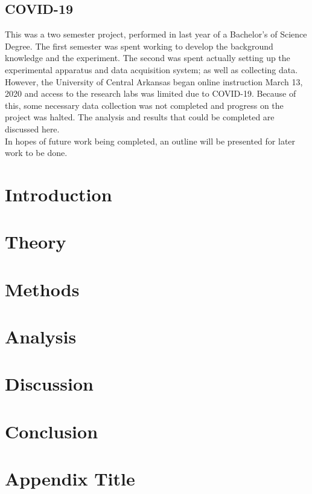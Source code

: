 \documentclass[letterpaper, 12pt]{report}
\begin{document}


\clearpage
\section*{COVID-19}
This was a two semester project, performed in last year of a Bachelor's of Science Degree. The first semester was spent working to develop the background knowledge and the experiment. The second was spent actually setting up the experimental apparatus and data acquisition system; as well as collecting data. However, the University of Central Arkansas began online instruction March 13, 2020 and access to the research labs was limited due to COVID-19. Because of this, some necessary data collection was not completed and progress on the project was halted. The analysis and results that could be completed are discussed here. \\
In hopes of future work being completed, an outline will be presented for later work to be done.

\tableofcontents
\printnomenclature[0.5in]

\chapter{Introduction}\label{chap:Introduction}


\chapter{Theory}\label{chap:Theory}


\chapter{Methods}\label{chap:Methods}


\chapter{Analysis}\label{chap:Analysis}


\chapter{Discussion}\label{chap:Discussion}


\chapter{Conclusion}\label{chap:Conclusion}


\nocite{*}



\appendix
\chapter{Appendix Title}\label{chap:Appendix}

\end{document}
